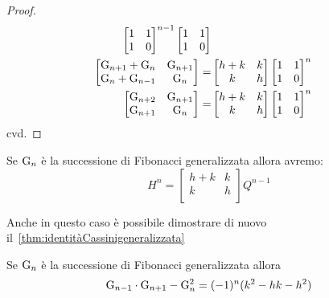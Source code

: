 \begin{proof}
\begin{align*}
\begin{bmatrix}
	1&1\\ 1&0\\
\end{bmatrix}^{n-1}\begin{bmatrix}
1&1\\ 1&0\\
\end{bmatrix}\\
\begin{bmatrix}
	\mathrm{G}_{n+1}+\mathrm{G}_{n}&\mathrm{G}_{n+1}\\\mathrm{G}_{n}+\mathrm{G}_{n-1}&\mathrm{G}_{n}
\end{bmatrix}=&\begin{bmatrix}
	h+k&k\\k&h\\
\end{bmatrix}\begin{bmatrix}
	1&1\\ 1&0\\
\end{bmatrix}^{n}\\
\begin{bmatrix}
	\mathrm{G}_{n+2}&\mathrm{G}_{n+1}\\\mathrm{G}_{n+1}&\mathrm{G}_{n}
\end{bmatrix}=&\begin{bmatrix}
	h+k&k\\k&h\\
\end{bmatrix}\begin{bmatrix}
	1&1\\ 1&0\\
\end{bmatrix}^{n}\\
\end{align*}
cvd.
\end{proof}
\begin{cor}[Derivazione]
	Se $\mathrm{G}_{n}$ è la successione di Fibonacci generalizzata allora avremo:
\begin{equation}
	H^n=\begin{bmatrix}
		h+k&k\\k&h\\
	\end{bmatrix}Q^{n-1}
\end{equation}
\end{cor}
Anche in questo caso è possibile dimostrare di nuovo 
il~\vref{thm:identitàCassinigeneralizzata} 
\begin{thm}\label{thm:identitàCassinigeneralizzatamatrici}
	Se $\mathrm{G}_{n}$ è la successione di Fibonacci generalizzata allora 
	\begin{equation}
		\mathrm{G}_{n-1}\cdot\mathrm{G}_{n+1}-\mathrm{G}_{n}^2=(-1)^n(k^2-hk-h^2)
	\end{equation}
\end{thm}
